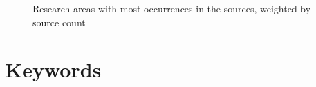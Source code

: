 \documentclass[a4paper]{article}
\begin{document}
\begin{figure}[p]
\caption{Research areas with most occurrences in the sources, weighted by source count}
\end{figure}

\clearpage

\section{Keywords}
\end{document}
